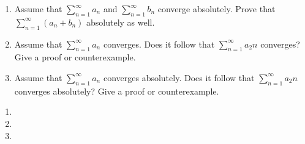\documentclass[12pt,letterpaper,boxed]{hmcpset}
\begin{document}
\begin{problem}[Exercise 3.7]
\begin{enumerate}
    \item Assume that $\sum_{n = 1}^{\infty} a_n$ and $\sum_{n = 1}^{\infty} b_n$ converge absolutely. Prove that $\sum_{n = 1}^{\infty} (a_n + b_n)$ absolutely as well.
    \item Assume that $\sum_{n = 1}^{\infty} a_n$ converges. Does it follow that $\sum_{n = 1}^{\infty} a_2n$ converges? Give a proof or counterexample.
    \item Assume that $\sum_{n = 1}^{\infty} a_n$ converges absolutely. Does it follow that $\sum_{n = 1}^{\infty} a_2n$ converges absolutely? Give a proof or counterexample.
\end{enumerate}
\end{problem}

\begin{solution}
\begin{enumerate}
    \item 
    \item
    \item 
\end{enumerate}
\end{solution}
\end{document}
